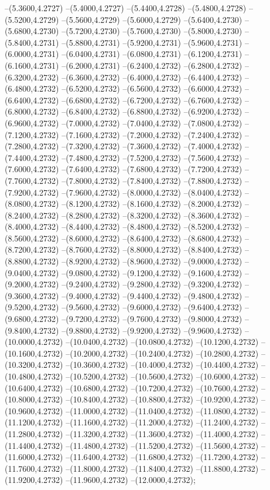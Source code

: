 {	--(5.3600,4.2727)
	--(5.4000,4.2727)
	--(5.4400,4.2728)
	--(5.4800,4.2728)
	--(5.5200,4.2729)
	--(5.5600,4.2729)
	--(5.6000,4.2729)
	--(5.6400,4.2730)
	--(5.6800,4.2730)
	--(5.7200,4.2730)
	--(5.7600,4.2730)
	--(5.8000,4.2730)
	--(5.8400,4.2731)
	--(5.8800,4.2731)
	--(5.9200,4.2731)
	--(5.9600,4.2731)
	--(6.0000,4.2731)
	--(6.0400,4.2731)
	--(6.0800,4.2731)
	--(6.1200,4.2731)
	--(6.1600,4.2731)
	--(6.2000,4.2731)
	--(6.2400,4.2732)
	--(6.2800,4.2732)
	--(6.3200,4.2732)
	--(6.3600,4.2732)
	--(6.4000,4.2732)
	--(6.4400,4.2732)
	--(6.4800,4.2732)
	--(6.5200,4.2732)
	--(6.5600,4.2732)
	--(6.6000,4.2732)
	--(6.6400,4.2732)
	--(6.6800,4.2732)
	--(6.7200,4.2732)
	--(6.7600,4.2732)
	--(6.8000,4.2732)
	--(6.8400,4.2732)
	--(6.8800,4.2732)
	--(6.9200,4.2732)
	--(6.9600,4.2732)
	--(7.0000,4.2732)
	--(7.0400,4.2732)
	--(7.0800,4.2732)
	--(7.1200,4.2732)
	--(7.1600,4.2732)
	--(7.2000,4.2732)
	--(7.2400,4.2732)
	--(7.2800,4.2732)
	--(7.3200,4.2732)
	--(7.3600,4.2732)
	--(7.4000,4.2732)
	--(7.4400,4.2732)
	--(7.4800,4.2732)
	--(7.5200,4.2732)
	--(7.5600,4.2732)
	--(7.6000,4.2732)
	--(7.6400,4.2732)
	--(7.6800,4.2732)
	--(7.7200,4.2732)
	--(7.7600,4.2732)
	--(7.8000,4.2732)
	--(7.8400,4.2732)
	--(7.8800,4.2732)
	--(7.9200,4.2732)
	--(7.9600,4.2732)
	--(8.0000,4.2732)
	--(8.0400,4.2732)
	--(8.0800,4.2732)
	--(8.1200,4.2732)
	--(8.1600,4.2732)
	--(8.2000,4.2732)
	--(8.2400,4.2732)
	--(8.2800,4.2732)
	--(8.3200,4.2732)
	--(8.3600,4.2732)
	--(8.4000,4.2732)
	--(8.4400,4.2732)
	--(8.4800,4.2732)
	--(8.5200,4.2732)
	--(8.5600,4.2732)
	--(8.6000,4.2732)
	--(8.6400,4.2732)
	--(8.6800,4.2732)
	--(8.7200,4.2732)
	--(8.7600,4.2732)
	--(8.8000,4.2732)
	--(8.8400,4.2732)
	--(8.8800,4.2732)
	--(8.9200,4.2732)
	--(8.9600,4.2732)
	--(9.0000,4.2732)
	--(9.0400,4.2732)
	--(9.0800,4.2732)
	--(9.1200,4.2732)
	--(9.1600,4.2732)
	--(9.2000,4.2732)
	--(9.2400,4.2732)
	--(9.2800,4.2732)
	--(9.3200,4.2732)
	--(9.3600,4.2732)
	--(9.4000,4.2732)
	--(9.4400,4.2732)
	--(9.4800,4.2732)
	--(9.5200,4.2732)
	--(9.5600,4.2732)
	--(9.6000,4.2732)
	--(9.6400,4.2732)
	--(9.6800,4.2732)
	--(9.7200,4.2732)
	--(9.7600,4.2732)
	--(9.8000,4.2732)
	--(9.8400,4.2732)
	--(9.8800,4.2732)
	--(9.9200,4.2732)
	--(9.9600,4.2732)
	--(10.0000,4.2732)
	--(10.0400,4.2732)
	--(10.0800,4.2732)
	--(10.1200,4.2732)
	--(10.1600,4.2732)
	--(10.2000,4.2732)
	--(10.2400,4.2732)
	--(10.2800,4.2732)
	--(10.3200,4.2732)
	--(10.3600,4.2732)
	--(10.4000,4.2732)
	--(10.4400,4.2732)
	--(10.4800,4.2732)
	--(10.5200,4.2732)
	--(10.5600,4.2732)
	--(10.6000,4.2732)
	--(10.6400,4.2732)
	--(10.6800,4.2732)
	--(10.7200,4.2732)
	--(10.7600,4.2732)
	--(10.8000,4.2732)
	--(10.8400,4.2732)
	--(10.8800,4.2732)
	--(10.9200,4.2732)
	--(10.9600,4.2732)
	--(11.0000,4.2732)
	--(11.0400,4.2732)
	--(11.0800,4.2732)
	--(11.1200,4.2732)
	--(11.1600,4.2732)
	--(11.2000,4.2732)
	--(11.2400,4.2732)
	--(11.2800,4.2732)
	--(11.3200,4.2732)
	--(11.3600,4.2732)
	--(11.4000,4.2732)
	--(11.4400,4.2732)
	--(11.4800,4.2732)
	--(11.5200,4.2732)
	--(11.5600,4.2732)
	--(11.6000,4.2732)
	--(11.6400,4.2732)
	--(11.6800,4.2732)
	--(11.7200,4.2732)
	--(11.7600,4.2732)
	--(11.8000,4.2732)
	--(11.8400,4.2732)
	--(11.8800,4.2732)
	--(11.9200,4.2732)
	--(11.9600,4.2732)
	--(12.0000,4.2732);
}
